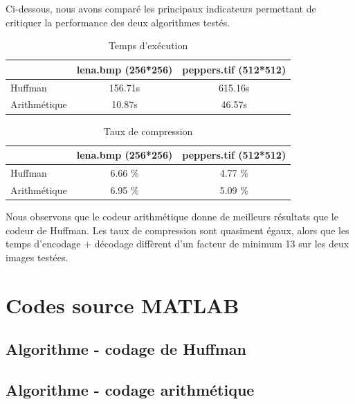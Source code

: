 \documentclass[a4paper, 12pt]{article}
\newcommand{\FSource}[1]{%

}
\begin{document}
Ci-dessous, nous avons comparé les principaux indicateurs permettant de critiquer la performance des deux algorithmes testés. \\

\begin{table}[!h]
	\centering
		\begin{tabular}{l|c | c|}
			\cline{2-3}
			                                   & lena.bmp (256*256) & peppers.tif (512*512) \\
			\hline
			\multicolumn{1}{|l|}{Huffman}      & 156.71s            &  615.16s               \\
			\hline
			\multicolumn{1}{|l|}{Arithmétique} & 10.87s             &  46.57s                \\
			\hline
		\end{tabular}
	\caption{Temps d’exécution}
	\label{tab:TableTempsExec}
\end{table}

\begin{table}[!h]
	\centering
		\begin{tabular}{l|c | c|}
			\cline{2-3}
			                                   & lena.bmp (256*256) & peppers.tif (512*512) \\
			\hline
			\multicolumn{1}{|l|}{Huffman}      & 6.66 \%            & 4.77 \%               \\
			\hline
			\multicolumn{1}{|l|}{Arithmétique} & 6.95 \%            & 5.09 \%               \\
			\hline
		\end{tabular}
	\caption{Taux de compression}
	\label{tab:TableTauxCompress}
\end{table}

Nous observons que le codeur arithmétique donne de meilleurs résultats que le codeur de Huffman. Les taux de compression sont quasiment égaux, alors que les temps d'encodage + décodage diffèrent d'un facteur de minimum 13 sur les deux images testées.

\clearpage
\appendix

\section{Codes source MATLAB}
\subsection{Algorithme - codage de Huffman}\label{algohuffman}

\FSource{../huffman.m}

\newpage
\subsection{Algorithme - codage arithmétique}\label{algoarithmetique}

\FSource{../arith.m}
\end{document}
